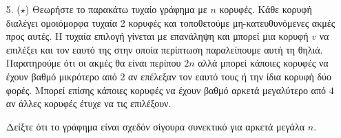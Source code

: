 \documentclass[a4paper, oneside, 11pt]{article}
\theoremstyle{definition}
\begin{document}
\begin{enumerate}
Λήμμα 1: Το $\frac{n!}{x!y!(n-x-y)!}$ μεγιστοποιείται για $x=y=\frac{n}{3}$.
\begin{proof}
Έστω ότι το ζητούμενο δεν ισχύει και $A$ η μέγιστη τιμή της παράστασης και χωρίς βλάβη της γενικότητας $x<\frac{n}{3}$ και $y>\frac{n}{3}$. Θεωρούμε $x'=x+1$ και $y'=y-1$. Τότε η νέα τιμή της παράστασης
είναι $A'=\frac{n!}{(x+1)!(y-1)!(n-x-y)!} = A \cdot \frac{y}{x+1}\geq A$. Αυτό είναι άτοπο, άρα το ζητούμενο ισχύει.
\end{proof}

Λήμμα 2: Το ${x \choose 2} + {y\choose 2} + {n-x-y \choose 2}$ ελαχιστοποιείται για $x=y=\frac{n}{3}$.
\begin{proof}
Η παραπάνω παράσταση είναι ίση με $\frac{1}{2} (x^2 + y^2 + (n-x-y)^2 - (x+y+n-x-y)) \geq_{cauchy-schwarz} \frac{1}{2}(\frac{1}{3} n^2 - n)$. Η ισότητα πραγματοποιείται όταν $x=y=n-x-y$, δηλαδή $x=y=\frac{n}{3}$.
\end{proof}

\item[5. ($\star$)]
   Θεωρήστε το παρακάτω τυχαίο γράφημα με $n$ κορυφές. Κάθε κορυφή διαλέγει
   ομοιόμορφα τυχαία 2 κορυφές και τοποθετούμε μη-κατευθυνόμενες ακμές προς
   αυτές. Η τυχαία επιλογή γίνεται με επανάληψη και μπορεί μια κορυφή $v$ να
   επιλέξει και τον εαυτό της στην οποία περίπτωση παραλείπουμε αυτή τη θηλιά.
   Παρατηρούμε ότι οι ακμές θα είναι περίπου $2n$ αλλά μπορεί κάποιες κορυφές να
   έχουν βαθμό μικρότερο από $2$ αν επέλεξαν τον εαυτό τους ή την ίδια κορυφή
   δύο φορές. Μπορεί επίσης κάποιες κορυφές να έχουν βαθμό αρκετά μεγαλύτερο από
   $4$ αν άλλες κορυφές έτυχε να τις επιλέξουν.

   Δείξτε ότι το γράφημα είναι σχεδόν σίγουρα συνεκτικό για αρκετά μεγάλα $n$.


\end{enumerate}
\end{document}
